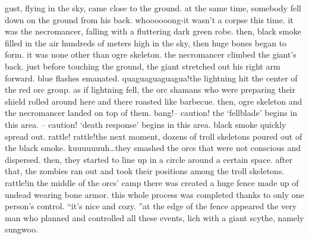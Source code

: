 gust, flying in the sky, came close to the ground.
 at the same time, somebody fell down on the ground from his back.
whoooooong-it wasn’t a corpse this time.
 it was the necromancer, falling with a fluttering dark green robe.
then, black smoke filled in the air hundreds of meters high in the sky, then huge bones began to form.
 it was none other than ogre skeleton.
the necromancer climbed the giant’s back.
 just before touching the ground, the giant stretched out his right arm forward.
blue flashes emanated.
quaguaguaguagua!the lightning hit the center of the red orc group.
 as if lightning fell, the orc shamans who were preparing their shield rolled around here and there roasted like barbecue.
then, ogre skeleton and the necromancer landed on top of them.
bang!– caution! the ‘fellblade’ begins in this area.
– caution! ‘death response’ begins in this area.
black smoke quickly spread out.
rattle! rattle!the next moment, dozens of troll skeletons poured out of the black smoke.
kuuuuuuuh…they smashed the orcs that were not conscious and dispersed.
then, they started to line up in a circle around a certain space.
after that, the zombies ran out and took their positions among the troll skeletons.
rattle!in the middle of the orcs’ camp there was created a huge fence made up of undead wearing bone armor.
this whole process was completed thanks to only one person’s control.
“it’s nice and cozy.
”at the edge of the fence appeared the very man who planned and controlled all these events, lich with a giant scythe, namely sungwoo.


 
